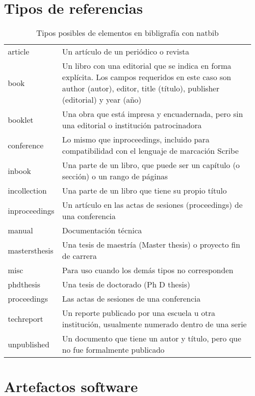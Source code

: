   \chapter{Tipos de referencias}
  \label{sec:bib}
    \begin{table} 
	\begin{center}
	\begin{tabular}{l p{10cm} }
	 \hline
   article& Un artículo de un periódico o revista\\
  
    book& Un libro con una editorial que se indica en forma explícita. Los campos requeridos en este caso son author (autor), editor, title (título), publisher (editorial) y year (año)\\
  
    booklet& Una obra que está impresa y encuadernada, pero sin una editorial o institución patrocinadora\\
  
    conference& Lo mismo que inproceedings, incluido para compatibilidad con el lenguaje de marcación Scribe\\
  
    inbook& Una parte de un libro, que puede ser un capítulo (o sección) o un rango de páginas\\
  
    incollection& Una parte de un libro que tiene su propio título\\
  
    inproceedings& Un artículo en las actas de sesiones (proceedings) de una conferencia\\
  
    manual& Documentación técnica\\
  
    mastersthesis& Una tesis de maestría (Master thesis) o proyecto fin de carrera\\
  
    misc& Para uso cuando los demás tipos no corresponden\\
  
    phdthesis& Una tesis de doctorado (Ph D thesis)\\
  
    proceedings& Las actas de sesiones de una conferencia\\
  
    techreport& Un reporte publicado por una escuela u otra institución, usualmente numerado dentro de una serie\\
  
    unpublished& Un documento que tiene un autor y título, pero que no fue formalmente publicado\\
          \hline
	\end{tabular}
	\end{center}
	\caption{Tipos posibles de elementos en bibligrafía con natbib}
\end{table}

 
  \chapter *{Artefactos software}



